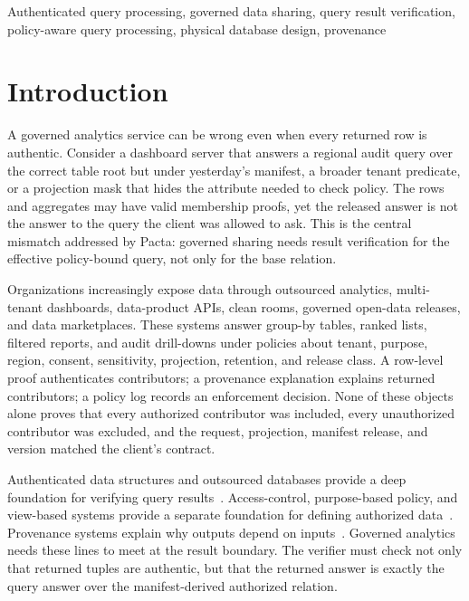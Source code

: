 \documentclass[conference]{IEEEtran}
\newcommand{\sys}{Pacta\xspace}
\begin{document}
\begin{IEEEkeywords}
Authenticated query processing, governed data sharing, query result verification, policy-aware query processing, physical database design, provenance
\end{IEEEkeywords}

\section{Introduction}
A governed analytics service can be wrong even when every returned row is authentic. Consider a dashboard server that answers a regional audit query over the correct table root but under yesterday's manifest, a broader tenant predicate, or a projection mask that hides the attribute needed to check policy. The rows and aggregates may have valid membership proofs, yet the released answer is not the answer to the query the client was allowed to ask. This is the central mismatch addressed by \sys: governed sharing needs result verification for the effective policy-bound query, not only for the base relation.

Organizations increasingly expose data through outsourced analytics, multi-tenant dashboards, data-product APIs, clean rooms, governed open-data releases, and data marketplaces. These systems answer group-by tables, ranked lists, filtered reports, and audit drill-downs under policies about tenant, purpose, region, consent, sensitivity, projection, retention, and release class. A row-level proof authenticates contributors; a provenance explanation explains returned contributors; a policy log records an enforcement decision. None of these objects alone proves that every authorized contributor was included, every unauthorized contributor was excluded, and the request, projection, manifest release, and version matched the client's contract.

Authenticated data structures and outsourced databases provide a deep foundation for verifying query results~\cite{devanbu2003authentic,martel2004model,tamassia2003ads,pang2004edge,pang2005completeness,mykletun2004outsourced,sion2005assurance,li2006dynamic,li2010aggregation,papadopoulos2009sae,papadopoulos2010streams,chen2013topk}. Access-control, purpose-based policy, and view-based systems provide a separate foundation for defining authorized data~\cite{stonebraker1974access,rizvi2004fgac,kabra2006fgac,chaudhuri2007predicated,byun2008purpose,colombo2015action,sandhu1996rbac,jajodia1997multipolicy}. Provenance systems explain why outputs depend on inputs~\cite{cui2000lineage,buneman2001whywhere,green2007semiring,cheney2009provenance,glavic2021provenance}. Governed analytics needs these lines to meet at the result boundary. The verifier must check not only that returned tuples are authentic, but that the returned answer is exactly the query answer over the manifest-derived authorized relation.
\end{document}
